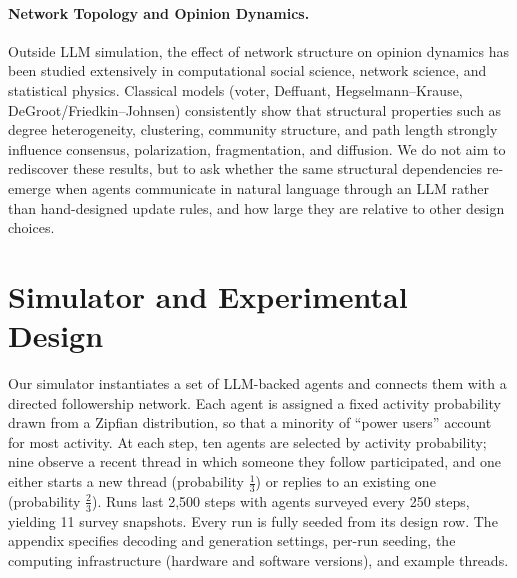 \documentclass[letterpaper]{article} %
\begin{document}
\paragraph{Network Topology and Opinion Dynamics.} Outside LLM simulation, the effect of network structure on opinion dynamics has been studied extensively in computational social science, network science, and statistical physics. Classical models (voter, Deffuant, Hegselmann--Krause, DeGroot/Friedkin--Johnsen) consistently show that structural properties such as degree heterogeneity, clustering, community structure, and path length strongly influence consensus, polarization, fragmentation, and diffusion. We do not aim to rediscover these results, but to ask whether the same structural dependencies re-emerge when agents communicate in natural language through an LLM rather than hand-designed update rules, and how large they are relative to other design choices.

\section{Simulator and Experimental Design}


Our simulator instantiates a set of LLM-backed agents and connects them with a directed followership network. Each agent is assigned a fixed activity probability drawn from a Zipfian distribution, so that a minority of ``power users'' account for most activity. At each step, ten agents are selected by activity probability; nine observe a recent thread in which someone they follow participated, and one either starts a new thread (probability $\frac{1}{3}$) or replies to an existing one (probability $\frac{2}{3}$). Runs last 2{,}500 steps with agents surveyed every 250 steps, yielding 11 survey snapshots. Every run is fully seeded from its design row. The appendix specifies decoding and generation settings, per-run seeding, the computing infrastructure (hardware and software versions), and example threads.
\end{document}
